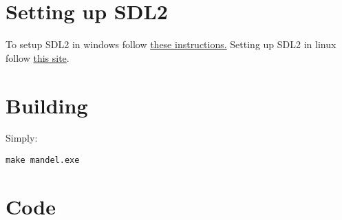 \documentclass[a4paper,11pt]{article}
\begin{document}
\section{Setting up SDL2}
\label{sec:orgdbca115}
To setup SDL2 in windows follow \href{https://gist.github.com/thales17/fb2e4cff60890a51d9dddd4c6e832ad2}{these instructions.} Setting up SDL2 in linux follow \href{https://gigi.nullneuron.net/gigilabs/how-to-set-up-sdl2-on-linux/}{this site}.
\section{Building}
\label{sec:org57c6911}
Simply:
\begin{verbatim}
make mandel.exe
\end{verbatim}
\section{Code}
\label{sec:org19bf9ee}
\end{document}
